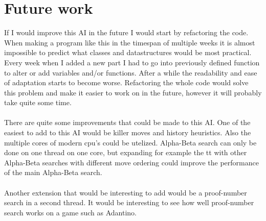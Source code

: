\documentclass{article}
\begin{document}
\section{Future work}
If I would improve this AI in the future I would start by refactoring the code. When making a program like this in the timespan of multiple weeks it is almost impossible to predict what classes and datastructures would be most practical. Every week when I added a new part I had to go into previously defined function to alter or add variables and/or functions. After a while the readability and ease of adaptation starts to become worse. Refactoring the whole code would solve this problem and make it easier to work on in the future, however it will probably take quite some time. %
\\
\\
There are quite some improvements that could be made to this AI. One of the easiest to add to this AI would be killer moves and history heuristics. Also the multiple cores of modern cpu's could be utelized. Alpha-Beta search can only be done on one thread on one core, but expanding for example the tt with other Alpha-Beta searches with different move ordering could improve the performance of the main Alpha-Beta search.
\\
\\
Another extension that would be interesting to add would be a proof-number search in a second thread. It would be interesting to see how well proof-number search works on a game such as Adantino.
\end{document}
